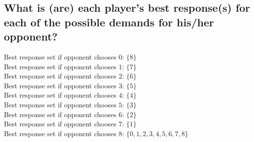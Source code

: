 \documentclass{article}
\begin{document}
\subsection{What is (are) each player's best response(s) for each of the possible demands for his/her
opponent?}


Best response set if opponent chooses $0$: $\{8\}$ \\
Best response set if opponent chooses $1$: $\{7\}$ \\
Best response set if opponent chooses $2$: $\{6\}$ \\
Best response set if opponent chooses $3$: $\{5\}$ \\
Best response set if opponent chooses $4$: $\{4\}$ \\
Best response set if opponent chooses $5$: $\{3\}$ \\
Best response set if opponent chooses $6$: $\{2\}$ \\
Best response set if opponent chooses $7$: $\{1\}$ \\
Best response set if opponent chooses $8$: $\{0,1,2,3,4,5,6,7,8\}$
\end{document}
